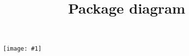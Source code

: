 \documentclass{article}
\newcommand{\diagram}[1]{
	\texttt{[image: \#1]}
}
\newcommand{\vertdiagram}[1]{
	\begin{sidewaysfigure}
		\diagram{#1}
	\end{sidewaysfigure}
}
\begin{document}
	\title{Package diagram}
	\date{}
	\maketitle
	\vertdiagram{PackageDiagram}
\end{document}
